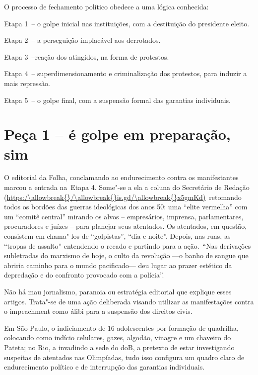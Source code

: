  

O processo de fechamento político obedece a uma lógica conhecida:

Etapa 1~-- o golpe inicial nas instituições, com a destituição do
presidente eleito.

Etapa 2~-- a perseguição implacável aos derrotados.

Etapa 3~--reação dos atingidos, na forma de protestos.

Etapa 4~-- superdimensionamento e criminalização dos protestos, para
induzir a mais repressão.

Etapa 5~-- o golpe final, com a suspensão formal das garantias
individuais.

\section{Peça 1 -- é golpe em preparação, sim}

O editorial da Folha, conclamando ao endurecimento contra os
manifestantes marcou a entrada na~Etapa 4. Some"-se a ela a coluna do
Secretário de Redação (\url{https:/\allowbreak{}/\allowbreak{}is.gd/\allowbreak{}x5gmKd)}~retomando todos os
bordões das guerras ideológicas dos anos 50: uma ``elite vermelha'' com
um ``comitê central'' mirando os alvos -- empresários, imprensa,
parlamentares, procuradores e juízes -- para planejar seus atentados. Os
atentados, em questão, consistem em chama"-los de ``golpistas'', ``dia e
noite''. Depois, nas ruas, as ``tropas de assalto'' entendendo o recado
e partindo para a ação.~``Nas derivações subletradas do marxismo de
hoje, o culto da revolução ---o banho de sangue que abriria caminho para
o mundo pacificado--- deu lugar ao prazer estético da depredação e do
confronto provocado com a polícia''.

Não há mau jornalismo, paranoia ou estratégia editorial que explique
esses artigos. Trata"-se de uma ação deliberada visando utilizar as
manifestações contra o impeachment como álibi para a suspensão dos
direitos civis.

Em São Paulo, o indiciamento de 16 adolescentes por formação de
quadrilha, colocando como indício celulares, gazes, algodão, vinagre e
um chaveiro do Pateta; no Rio, a  invadindo a sede do doB, a
pretexto de estar investigando suspeitas de atentados nas Olimpíadas,
tudo isso configura um quadro claro de endurecimento político e de
interrupção das garantias individuais.

